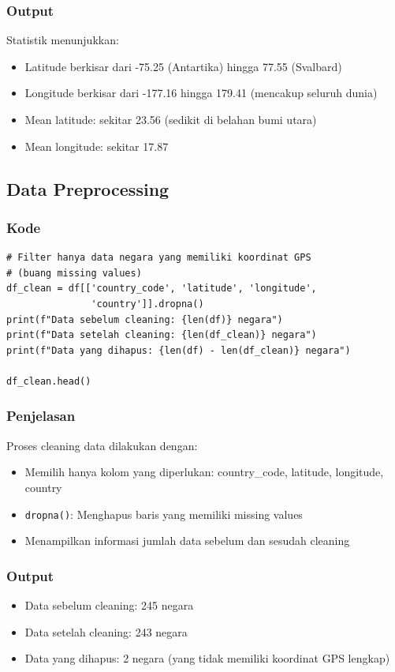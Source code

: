 \documentclass[12pt,a4paper]{article}
\begin{document}
\subsubsection{Output}
Statistik menunjukkan:
\begin{itemize}
    \item Latitude berkisar dari -75.25 (Antartika) hingga 77.55 (Svalbard)
    \item Longitude berkisar dari -177.16 hingga 179.41 (mencakup seluruh dunia)
    \item Mean latitude: sekitar 23.56 (sedikit di belahan bumi utara)
    \item Mean longitude: sekitar 17.87
\end{itemize}

\subsection{Data Preprocessing}

\subsubsection{Kode}
\begin{lstlisting}[style=pythonstyle]
# Filter hanya data negara yang memiliki koordinat GPS 
# (buang missing values)
df_clean = df[['country_code', 'latitude', 'longitude', 
               'country']].dropna()
print(f"Data sebelum cleaning: {len(df)} negara")
print(f"Data setelah cleaning: {len(df_clean)} negara")
print(f"Data yang dihapus: {len(df) - len(df_clean)} negara")

df_clean.head()
\end{lstlisting}

\subsubsection{Penjelasan}
Proses cleaning data dilakukan dengan:
\begin{itemize}
    \item Memilih hanya kolom yang diperlukan: country\_code, latitude, longitude, country
    \item \texttt{dropna()}: Menghapus baris yang memiliki missing values
    \item Menampilkan informasi jumlah data sebelum dan sesudah cleaning
\end{itemize}

\subsubsection{Output}
\begin{itemize}
    \item Data sebelum cleaning: 245 negara
    \item Data setelah cleaning: 243 negara
    \item Data yang dihapus: 2 negara (yang tidak memiliki koordinat GPS lengkap)
\end{itemize}
\end{document}
